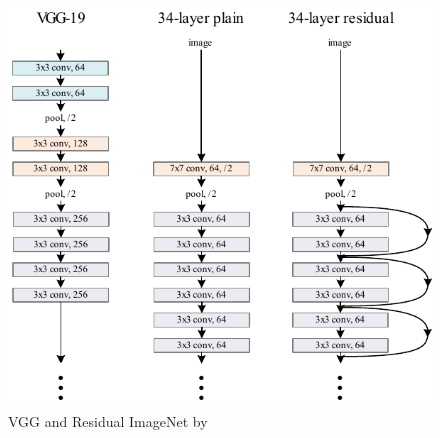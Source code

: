 \begin{minipage}[ht]{.62\textwidth}
    \begin{figure}[H]
        \centering
    \includegraphics[width=.99\textwidth]{literature/imgs/ext-CNN-ResNet.pdf}
    \caption{VGG and Residual ImageNet by \citet{he2015deep}}
    \label{fig:ext-CNN-ResNet}
    \end{figure}
\end{minipage}
\hspace{1em}
